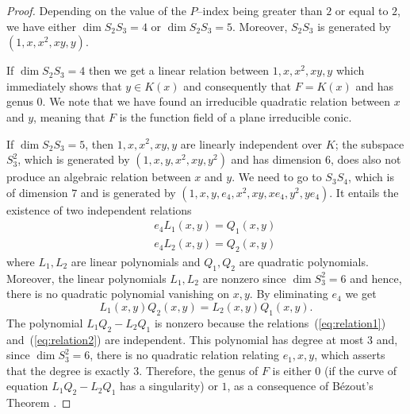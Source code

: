 \documentclass{article}
\theoremstyle{plain}
\theoremstyle{definition}
\theoremstyle{remark}
\begin{document}
  
\begin{proof}
  Depending on the value of the $P$--index being greater than $2$ or
  equal to $2$, we have either $\dim S_2 S_3 = 4$ or $\dim S_2 S_3 = 5$.
Moreover, $S_2S_3$ is generated by $(1,x,x^2,xy,y)$. 

If $\dim S_2 S_3 = 4$ then we get a linear relation between
  $1,x,x^2,xy,y$ which immediately shows that $y\in K(x)$ and
  consequently  that $F=K(x)$ and has genus $0$. We note that we have
  found an irreducible  quadratic relation between $x$ and $y$,
  meaning that $F$  is the function field of a
      plane irreducible conic. 

If   $\dim S_2 S_3 = 5$, then $1,x,x^2,xy,y$ are linearly
  independent over $K$; the subspace $S_3^2$, which is generated by
  $(1, x, y, x^2, x y, y^2)$ and has dimension $6$, does also not produce
  an algebraic relation between $x$ and $y$. We need to go to
  $S_3S_4$, which is of dimension $7$ and is generated by $(1, x, y, e_4, x^2, x y, x e_4,
      y^2, y e_4)$. It  entails the existence of two
      independent relations
      \begin{eqnarray}
       && e_4 L_1(x,y) = Q_1(x, y) \label{eq:relation1}\\
       && e_4 L_2(x,y) = Q_2(x, y) \label{eq:relation2}
      \end{eqnarray}
      where $L_1, L_2$ are linear polynomials and $Q_1, Q_2$ are
      quadratic polynomials.
      Moreover, the linear polynomials $L_1, L_2$ are nonzero since 
      $\dim S_3^2 = 6$ and hence, there is no quadratic polynomial vanishing
      on $x, y$.  By eliminating  $e_4$ we get
      \begin{equation}
      L_1(x, y) Q_2 (x, y) = L_2(x, y) Q_1(x, y).
      \end{equation}
      The polynomial
      $L_1 Q_2 - L_2 Q_1$ is nonzero because the relations~(\ref{eq:relation1})
      and~(\ref{eq:relation2}) are independent.  This polynomial has degree at
      most $3$ and, since $\dim S_3^2 = 6$, there is no quadratic
      relation relating $e_1, x, y$, which asserts that the degree
      is exactly $3$. Therefore, the genus of $F$ is either $0$ (if
      the curve of equation $L_1 Q_2 - L_2 Q_1$ has a singularity) or
      $1$, as a consequence of B\'ezout's Theorem \cite{Fulton}.
\end{proof}
\end{document}
